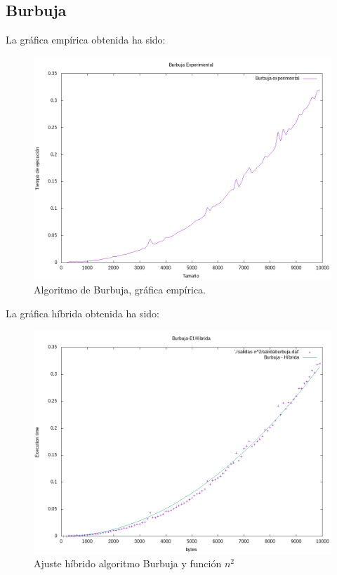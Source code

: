 \subsection{Burbuja}


La gráfica empírica obtenida ha sido:
\begin{figure}[H]
	\centering
	\includegraphics[scale=0.5]{imagenes/burbuja-experimental.png}
	\caption{Algoritmo de Burbuja, gráfica empírica.}
	\label{fig:E2}
\end{figure}





La gráfica híbrida obtenida ha sido:
\begin{figure}[H]
	\centering
	\includegraphics[scale=0.5]{imagenes/burbuja-hibrida.png}
	\caption{Ajuste híbrido algoritmo Burbuja y función $n^2$}
	\label{fig:E3}
\end{figure}	






